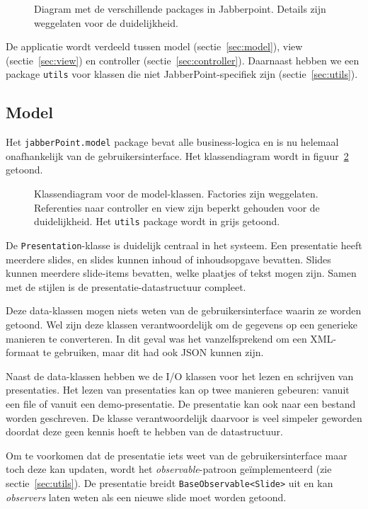 \documentclass[a4paper]{article}
\newcommand{\code}[1]{\lstinline[columns=fixed]{#1}}
\newcommand{\diagram}[3][1.3]{
	\begin{figure}[!htb]
	 \caption{#3}
	 \label{diagram:#2}
	 \makebox[\textwidth][c]{\texttt{[image: Diagrams/\#2.pdf]}}%
	\end{figure}
}
\begin{document}
		\diagram{jabberPoint-packages}{
			Diagram met de verschillende packages in Jabberpoint.
			Details zijn weggelaten voor de duidelijkheid.
		}
		
		De applicatie wordt verdeeld tussen model (sectie~\ref{sec:model}), view (sectie~\ref{sec:view}) en controller (sectie~\ref{sec:controller}).
		Daarnaast hebben we een package \code{utils} voor klassen die niet JabberPoint-specifiek zijn (sectie~\ref{sec:utils}).

	\subsection{Model}\label{ref:model}
		Het \code{jabberPoint.model} package bevat alle business-logica en is nu helemaal onafhankelijk van de gebruikersinterface.
		Het klassendiagram wordt in figuur~\ref{diagram:model} getoond.

		\diagram{model}{
			Klassendiagram voor de model-klassen.
			Factories zijn weggelaten.
			Referenties naar controller en view zijn beperkt gehouden voor de duidelijkheid.
			Het \code{utils} package wordt in grijs getoond.
		}

		De \code{Presentation}-klasse is duidelijk centraal in het systeem.
		Een presentatie heeft meerdere slides, en slides kunnen inhoud of inhoudsopgave bevatten.
		Slides kunnen meerdere slide-items bevatten, welke plaatjes of tekst mogen zijn.
		Samen met de stijlen is de presentatie-datastructuur compleet.

		Deze data-klassen mogen niets weten van de gebruikersinterface waarin ze worden getoond.
		Wel zijn deze klassen verantwoordelijk om de gegevens op een generieke manieren te converteren.
		In dit geval was het vanzelfsprekend om een XML-formaat te gebruiken, maar dit had ook JSON kunnen zijn.

		Naast de data-klassen hebben we de I/O klassen voor het lezen en schrijven van presentaties.
		Het lezen van presentaties kan op twee manieren gebeuren: vanuit een file of vanuit een demo-presentatie.
		De presentatie kan ook naar een bestand worden geschreven.
		De klasse verantwoordelijk daarvoor is veel simpeler geworden doordat deze geen kennis hoeft te hebben van de datastructuur.

		Om te voorkomen dat de presentatie iets weet van de gebruikersinterface maar toch deze kan updaten, wordt het \textit{observable}-patroon geïmplementeerd (zie sectie~\ref{sec:utils}).
		De presentatie breidt \code{BaseObservable<Slide>} uit en kan \textit{observers} laten weten als een nieuwe slide moet worden getoond.
\end{document}
